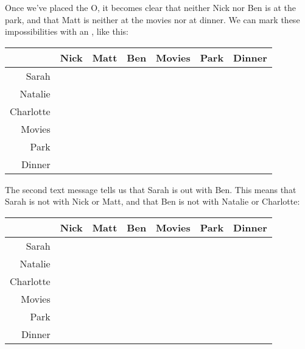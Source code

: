 Once we've placed the O, it becomes clear that neither Nick nor Ben is at the park, and that Matt is neither at the movies nor at dinner.  We can mark these impossibilities with an \mX{}, like this:

\begin{tcolorbox}[width=\textwidth,colback=black!10]
    \begin{center}
        \begin{tabular}{r|c|c|c||c|c|c|}
            & Nick & Matt & Ben & Movies & Park & Dinner\\
            \hline\hline
            Sarah & & & & & & \\
            \hline
            Natalie & & & & & &\\
            \hline
            Charlotte & & & & & & \\
            \hline\hline
            Movies & & \mX{} & \\
            \cline{1-4}
            Park & \mX{} & \mO{} & \mX{} \\
            \cline{1-4}
            Dinner & & \mX{} &\\
            \cline{1-4}
        \end{tabular}
    \end{center}
\end{tcolorbox}

The second text message tells us that Sarah is out with Ben.  This means that Sarah is not with Nick or Matt, and that Ben is not with Natalie or Charlotte:

\begin{tcolorbox}[width=\textwidth,colback=black!10]
    \begin{center}
        \begin{tabular}{r|c|c|c||c|c|c|}
            & Nick & Matt & Ben & Movies & Park & Dinner\\
            \hline\hline
            Sarah & \mX{} & \mX{} & \mO{} & & & \\
            \hline
            Natalie & & & \mX{} & & &\\
            \hline
            Charlotte & & & \mX{} & & & \\
            \hline\hline
            Movies & & \mX{} & \\
            \cline{1-4}
            Park & \mX{} & \mO{} & \mX{} \\
            \cline{1-4}
            Dinner & & \mX{} &\\
            \cline{1-4}
        \end{tabular}
    \end{center}
\end{tcolorbox}

